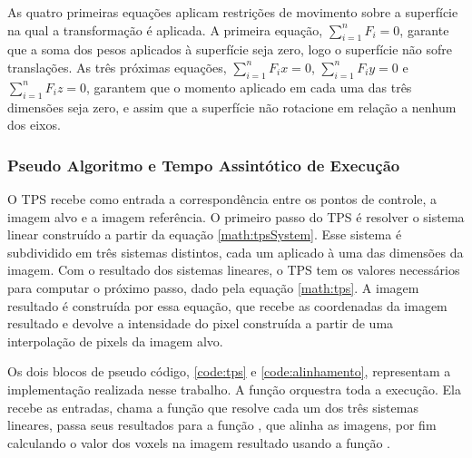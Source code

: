   As quatro primeiras equações aplicam restrições de movimento sobre a
superfície na qual a transformação é aplicada. A primeira equação,
$\sum_{i=1}^n F_i = 0$, garante que a soma dos pesos aplicados à superfície
seja zero, logo o superfície não sofre translações. As três próximas equações,
$\sum_{i=1}^n F_ix = 0$, $\sum_{i=1}^n F_iy = 0$ e $\sum_{i=1}^n F_iz = 0$,
garantem que o momento aplicado em cada uma das três dimensões seja zero, e
assim que a superfície não rotacione em relação a nenhum dos eixos.

\subsubsection{Pseudo Algoritmo e Tempo Assintótico de Execução}

  O TPS recebe como entrada a correspondência entre os pontos de controle, a
imagem alvo e a imagem referência. O primeiro passo do TPS é resolver o
sistema linear construído a partir da equação \ref{math:tpsSystem}. Esse sistema
é subdividido em três sistemas distintos, cada um aplicado à uma das dimensões
da imagem. Com o resultado dos sistemas lineares, o TPS tem os valores
necessários para computar o próximo passo, dado pela equação \ref{math:tps}.
A imagem resultado é construída por essa equação, que recebe as coordenadas da
imagem resultado e devolve a intensidade do pixel construída a partir de uma
interpolação de pixels da imagem alvo.

  Os dois blocos de pseudo código, \ref{code:tps} e \ref{code:alinhamento}, representam
a implementação realizada nesse trabalho. A função  orquestra toda a
execução. Ela recebe as entradas, chama a função  que
resolve cada um dos três sistemas lineares, passa seus resultados para a função
, que alinha as imagens, por fim calculando o valor dos
voxels na imagem resultado usando a função .



